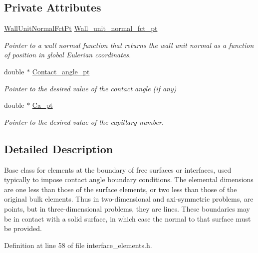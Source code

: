 \subsection*{Private Attributes}
\begin{DoxyCompactItemize}
\item 
\hyperlink{classoomph_1_1FluidInterfaceBoundingElement_a09c0b1df7d653eaf55e94e3951d409dd}{Wall\+Unit\+Normal\+Fct\+Pt} \hyperlink{classoomph_1_1FluidInterfaceBoundingElement_abc765a3b2c4eac762a1a5ba85ac4a7a4}{Wall\+\_\+unit\+\_\+normal\+\_\+fct\+\_\+pt}
\begin{DoxyCompactList}\small\item\em Pointer to a wall normal function that returns the wall unit normal as a function of position in global Eulerian coordinates. \end{DoxyCompactList}\item 
double $\ast$ \hyperlink{classoomph_1_1FluidInterfaceBoundingElement_a351532c356c9e839cba87150bea354c5}{Contact\+\_\+angle\+\_\+pt}
\begin{DoxyCompactList}\small\item\em Pointer to the desired value of the contact angle (if any) \end{DoxyCompactList}\item 
double $\ast$ \hyperlink{classoomph_1_1FluidInterfaceBoundingElement_abf47719443253c1117705b0a20e9ef70}{Ca\+\_\+pt}
\begin{DoxyCompactList}\small\item\em Pointer to the desired value of the capillary number. \end{DoxyCompactList}\end{DoxyCompactItemize}


\subsection{Detailed Description}
Base class for elements at the boundary of free surfaces or interfaces, used typically to impose contact angle boundary conditions. The elemental dimensions are one less than those of the surface elements, or two less than those of the original bulk elements. Thus in two-\/dimensional and axi-\/symmetric problems, are points, but in three-\/dimensional problems, they are lines. These boundaries may be in contact with a solid surface, in which case the normal to that surface must be provided. 

Definition at line 58 of file interface\+\_\+elements.\+h.



